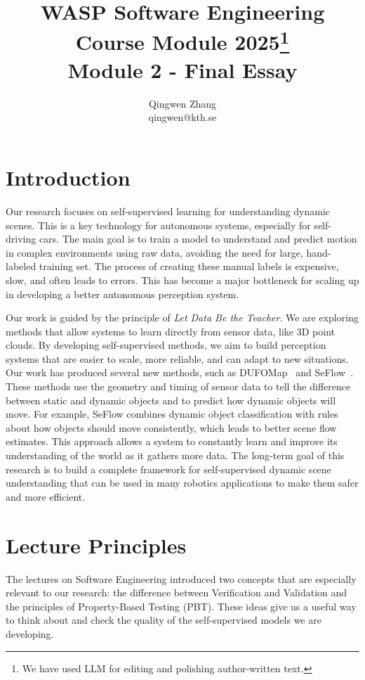 \documentclass{article}
\title{WASP Software Engineering Course Module 2025\footnote{We have used LLM for editing and polishing author-written text.} \\ Module 2 - Final Essay}
\author{Qingwen Zhang \\ qingwen@kth.se}
\begin{document}
\maketitle

\section{Introduction}

Our research focuses on self-supervised learning for understanding dynamic scenes. This is a key technology for autonomous systems, especially for self-driving cars. The main goal is to train a model to understand and predict motion in complex environments using raw data, avoiding the need for large, hand-labeled training set. The process of creating these manual labels is expensive, slow, and often leads to errors. This has become a major bottleneck for scaling up in developing a better autonomous perception system.

Our work is guided by the principle of \textit{Let Data Be the Teacher}. We are exploring methods that allow systems to learn directly from sensor data, like 3D point clouds. By developing self-supervised methods, we aim to build perception systems that are easier to scale, more reliable, and can adapt to new situations. Our work has produced several new methods, such as DUFOMap~\cite{daniel2024dufomap} and SeFlow~\cite{zhang2024seflow}. These methods use the geometry and timing of sensor data to tell the difference between static and dynamic objects and to predict how dynamic objects will move. For example, SeFlow combines dynamic object classification with rules about how objects should move consistently, which leads to better scene flow estimates. This approach allows a system to constantly learn and improve its understanding of the world as it gathers more data. The long-term goal of this research is to build a complete framework for self-supervised dynamic scene understanding that can be used in many robotics applications to make them safer and more efficient.

\section{Lecture Principles}
The lectures on Software Engineering introduced two concepts that are especially relevant to our research: the difference between Verification and Validation and the principles of Property-Based Testing (PBT). These ideas give us a useful way to think about and check the quality of the self-supervised models we are developing.
\end{document}
